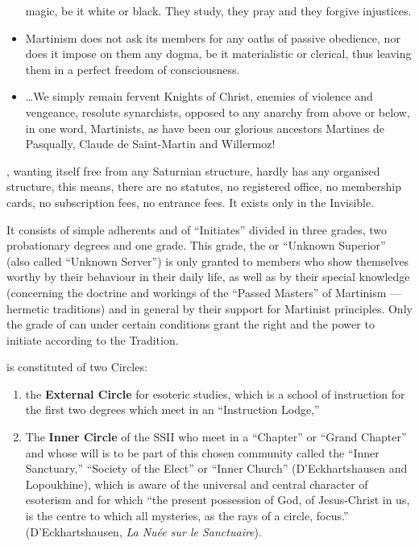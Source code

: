 \begin{quotebox}
\begin{itemize}
magic, be it white or black. They study, they pray and they forgive injustices.
    \item Martinism does not ask its members for any oaths of passive obedience, nor does
it impose on them any dogma, be it materialistic or clerical, thus leaving them in a
perfect freedom of consciousness.
    \item \ldots We simply remain fervent Knights of
Christ, enemies of violence and vengeance, resolute synarchists, opposed to any
anarchy from above or below, in one word, Martinists, as have been our glorious
ancestors Martines de Pasqually, Claude de Saint-Martin and Willermoz!
\end{itemize}
\end{quotebox}

\mouplong{}, wanting itself free from any Saturnian structure, hardly has any organised structure, this means, there are no statutes, no registered office, no membership cards, no subscription fees, no entrance fees. It exists only in the Invisible.

It consists of simple adherents and of ``Initiates'' divided in three grades, two
probationary degrees and one grade. This grade, the \si{} or ``Unknown
Superior'' (also called ``Unknown Server'') is only granted to members who show
themselves worthy by their behaviour in their daily life, as well as by their special
knowledge (concerning the doctrine and workings of the ``Passed Masters'' of
Martinism --- hermetic traditions) and in general by their support for Martinist
principles. Only the grade of \si{} can under certain conditions grant the right
and the power to initiate according to the Tradition.

\moup{} is constituted of two Circles:

\begin{enumerate}[label=\alph*)]
    \item the \textbf{External Circle} for esoteric studies, which is a school of instruction for the first two degrees which meet in an ``Instruction Lodge,''
    \item The \textbf{Inner Circle} of the SS\hexdot{}II\hexdot{} who meet in a ``Chapter'' or ``Grand Chapter'' and whose will is to be part of this chosen community called the ``Inner Sanctuary,'' ``Society of the Elect'' or ``Inner Church'' (D’Eckhartshausen and Lopoukhine), which is aware of the universal and central character of esoterism and for which ``the present possession of God, of Jesus-Christ in us, is the centre to which all mysteries, as the rays of a circle, focus.'' (D’Eckhartshausen, \textit{La Nuée sur le Sanctuaire}).
\end{enumerate}

